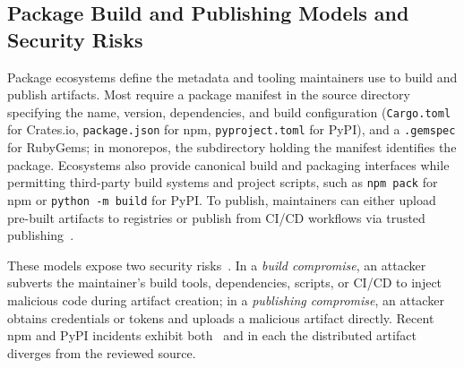 


\subsection{Package Build and Publishing Models and Security Risks}
\label{subsec:bg-build-publish-workflows}


Package ecosystems define the metadata and tooling maintainers use to build and publish artifacts. 
Most require a package manifest in the source directory specifying the name, version, dependencies, and build configuration (\texttt{Cargo.toml} for Crates.io, \texttt{package.json} for npm, \texttt{pyproject.toml} for PyPI), and a \texttt{.gemspec} for RubyGems; in monorepos, the subdirectory holding the manifest identifies the package. 
Ecosystems also provide canonical build and packaging interfaces while permitting third-party build systems and project scripts, such as \texttt{npm pack} for npm or \texttt{python -m build} for PyPI.
To publish, maintainers can either upload pre-built artifacts to registries or publish from CI/CD workflows via trusted publishing~\cite{noauthor_trusted_nodate, crates-trusted-publishing}.


These models expose two security risks~\cite{noauthor_supply_nodate, ohm_backstabbers_2020, duan_towards_2021}. 
In a \emph{build compromise}, an attacker subverts the maintainer's build tools, dependencies, scripts, or CI/CD to inject malicious code during artifact creation; in a \emph{publishing compromise}, an attacker obtains credentials or tokens and uploads a malicious artifact directly. 
Recent npm and PyPI incidents exhibit both~\cite{stepsecurityDurabletask2026, snykTanstack2026, snyk-litellm-2026, noauthor_account_nodate, axiosPostmortem2026, pandyaMaliciousDYdXPackages2026} and in each the distributed artifact diverges from the reviewed source.



